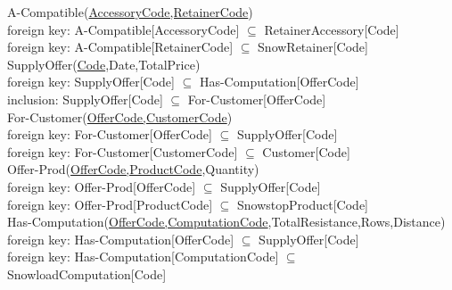 {{\color{ForestGreen}A-Compatible(\underline{AccessoryCode,RetainerCode})}\\
{\color{Orange}\hspace{2mm} foreign key: {\color{Magenta}A-Compatible[AccessoryCode] $\subseteq$ RetainerAccessory[Code]}} \\
{\color{Orange}\hspace{2mm} foreign key: {\color{Magenta}A-Compatible[RetainerCode] $\subseteq$ SnowRetainer[Code]}} \\

{\color{ForestGreen}SupplyOffer(\underline{Code},Date,TotalPrice)}\\
{\color{Orange}\hspace{2mm} foreign key: {\color{Magenta}SupplyOffer[Code] $\subseteq$ Has-Computation[OfferCode]}} \\
{\color{Orange}\hspace{2mm} inclusion: {\color{Magenta}SupplyOffer[Code] $\subseteq$ For-Customer[OfferCode]}} \\

{\color{ForestGreen}For-Customer(\underline{OfferCode,CustomerCode})}\\
{\color{Orange}\hspace{2mm} foreign key: {\color{Magenta}For-Customer[OfferCode] $\subseteq$ SupplyOffer[Code]}} \\
{\color{Orange}\hspace{2mm} foreign key: {\color{Magenta}For-Customer[CustomerCode] $\subseteq$ Customer[Code]}} \\

{\color{ForestGreen}Offer-Prod(\underline{OfferCode,ProductCode},Quantity)}\\
{\color{Orange}\hspace{2mm} foreign key: {\color{Magenta}Offer-Prod[OfferCode] $\subseteq$ SupplyOffer[Code]}} \\
{\color{Orange}\hspace{2mm} foreign key: {\color{Magenta}Offer-Prod[ProductCode] $\subseteq$ SnowstopProduct[Code]}} \\

{\color{ForestGreen}Has-Computation(\underline{OfferCode,ComputationCode},TotalResistance,Rows,Distance)}\\
{\color{Orange}\hspace{2mm} foreign key: {\color{Magenta}Has-Computation[OfferCode] $\subseteq$ SupplyOffer[Code]}} \\
{\color{Orange}\hspace{2mm} foreign key: {\color{Magenta}Has-Computation[ComputationCode] $\subseteq$ SnowloadComputation[Code]}} \\

}
